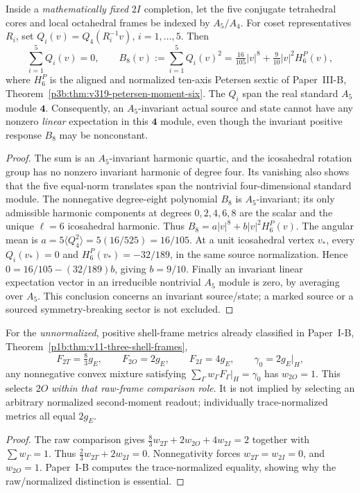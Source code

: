 \documentclass[12pt,a4paper]{article}
\begin{document}
\begin{proposition}
\label{p3c:prop:v1188-fiveframe-quartic-cancellation}
Inside a \emph{mathematically fixed} $2I$ completion, let the five
conjugate tetrahedral cores and local octahedral frames be indexed by
$A_5/A_4$.  For coset representatives $R_i$, set
$Q_i(v)=Q_4(R_i^{-1}v)$, $i=1,\ldots,5$.  Then
\[
  \boxed{\sum_{i=1}^5Q_i(v)=0},\qquad
  \boxed{B_8(v):=\sum_{i=1}^5Q_i(v)^2
      =\tfrac{16}{105}|v|^8+\tfrac9{10}|v|^2H_6^P(v)},
\]
where $H_6^P$ is the aligned and normalized ten-axis Petersen
sextic of Paper~III-B,
Theorem~\ref{p3b:thm:v319-petersen-moment-six}.
The $Q_i$ span the real standard $A_5$ module $\mathbf4$.
Consequently, an $A_5$-invariant actual source and state cannot have
any nonzero \emph{linear} expectation in this $\mathbf4$ module, even
though the invariant positive response $B_8$ may be nonconstant.
\end{proposition}
\begin{proof}
The sum is an $A_5$-invariant harmonic quartic, and the
icosahedral rotation group has no nonzero invariant harmonic of
degree four.  Its vanishing also shows that the five equal-norm
translates span the nontrivial four-dimensional standard module.
The nonnegative degree-eight polynomial $B_8$ is $A_5$-invariant;
its only admissible harmonic components at degrees $0,2,4,6,8$
are the scalar and the unique $\ell=6$ icosahedral harmonic.  Thus
$B_8=a|v|^8+b|v|^2H_6^P(v)$.  The angular mean is
$a=5\langle Q_4^2\rangle=5(16/525)=16/105$.
At a unit icosahedral vertex $v_*$, every $Q_i(v_*)=0$ and
$H_6^P(v_*)=-32/189$, in the same source normalization. Hence
$0=16/105-(32/189)b$, giving $b=9/10$.
Finally an invariant linear expectation vector in an irreducible
nontrivial $A_5$ module is zero, by averaging over $A_5$.
This conclusion concerns an invariant source/state; a marked source
or a sourced symmetry-breaking sector is not excluded.
\end{proof}

\begin{corollary}
\label{p3c:cor:v1188-raw-levi-frame-conditional}
For the \emph{unnormalized}, positive shell-frame metrics already
classified in Paper~I-B,
Theorem~\ref{p1b:thm:v11-three-shell-frames},
\[
 F_{2T}=\tfrac83g_E,\qquad F_{2O}=2g_E,\qquad F_{2I}=4g_E,
 \qquad \gamma_0=2g_E|_H,
\]
any nonnegative convex mixture satisfying
$\sum_\Gamma w_\Gamma F_\Gamma|_H=\gamma_0$ has
$w_{2O}=1$.  This selects $2O$ \emph{within that raw-frame
comparison role}.  It is not implied by selecting an arbitrary
normalized second-moment readout; individually trace-normalized
metrics all equal $2g_E$.
\end{corollary}
\begin{proof}
The raw comparison gives
$\tfrac83w_{2T}+2w_{2O}+4w_{2I}=2$ together with
$\sum w_\Gamma=1$.  Thus
$\tfrac23w_{2T}+2w_{2I}=0$.  Nonnegativity forces
$w_{2T}=w_{2I}=0$, and $w_{2O}=1$.
Paper~I-B computes the trace-normalized equality, showing why the
raw/normalized distinction is essential.
\end{proof}
\end{document}
